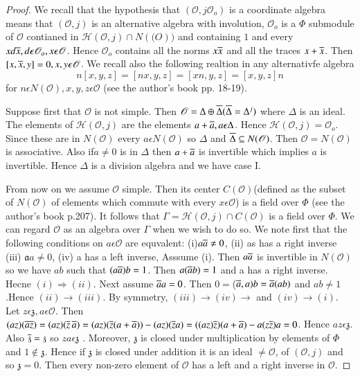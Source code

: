 \begin{proof}
We recall that the hypothesis that $(\mathscr{O},j\mathscr{O}_o)$ is a
coordinate algebra means that $(\mathscr{O},j)$ is an alternative
algebra with involution, $\mathscr{O}_o$ is a $\Phi$ submodule of
$\mathscr{O}$ contianed in
$\mathscr{H}(\mathscr{O},j)\cap N(\mathscr(O))$ and containing $1$ and
every $x d\overline{x}, d\epsilon \mathscr{O}_o,x\epsilon
\mathscr{O}$. Hence $\mathscr{O}_o$ contains all the norms $x\overline{x}$
and all the traces $x+\overline{x}$. Then $[x,\overline{x},y]=0,x,y\epsilon
  \mathscr{O}$. We recall also the following realtion in any
  alternativfe algebra
\begin{equation*}
n[x,y,z]=[nx,y,z]=[xn,y,z]=[x,y,z]n\tag{17}\label{c3:eq17}
\end{equation*} 
for $n\epsilon N(\mathscr{O}),x,y,z\epsilon \mathscr{O}$ (see the
author's book pp. 18-19).

Suppose first that $\mathscr{O}$ is not simple. Then
$\mathscr{O}=\Delta\oplus \overline{\Delta}(\overline{\Delta}=\Delta^{j})$ where
$\Delta$ is an ideal. The elements of $\mathscr{H}(\mathscr{O},j)$ are
the elements $a+\overline{a},a\epsilon \Delta$. Hence
$\mathscr{H}(\mathscr{O}, j)= \mathscr{O}_o$. Since these are in
$N(\mathscr{O})$ every 
$a\epsilon N(\mathscr{O}) $ so $\Delta$ and $\overline{\Delta}\subseteq
N(\mathscr{O})$. Then $\mathscr{O}=N (\mathscr{O})$ is
associative. Also if\pageoriginale $a\neq 0$ is in 
$\Delta$ then $a+\overline{a}$ is invertible which implies $a$ is
invertible. Hence $\Delta$ is a division algebra and we have case I. 

From now on we assume $\mathscr{O}$ simple. Then its center
$C(\mathscr{O})$(defined as the subset of $N(\mathscr{O})$ of elements
which commute with every $x\epsilon \mathscr{O}$) is a field over
$\Phi$ (see the author's book p.207). It follows that
$\Gamma=\mathscr{H}(\mathscr{O},j)\cap C(\mathscr{O})$ is a field over
$\Phi$. We can regard $\mathscr{O}$ as an algebra over $\Gamma$ when
we wish to do so. We note first that the following conditions on
$a\epsilon \mathscr{O}$ are equvalent: (i)$a\overline{a}\neq 0$, (ii) as has
a right inverse (iii) $\mathfrak{a}a\neq 0$, (iv) a has a left inverse,
Asssume (i). Then $a{\overline{a}}$ is invertible in $N(\mathscr{O})$ so
we have $ab$ such that $(a \overline{a})b=1$. Then $a(\overline{a}b)=1$ and a has a
right inverse. Hecne $(i)\Rightarrow (ii)$. Next assume
$\overline{a}a=0$. Then $0=$($\overline{a},a)b=\overline{a}(ab)$ and $ab\neq1$.Hence
$(ii)\to(iii)$. By symmetry, $(iii)\to (iv)\to$ and $(iv)\to (i)$. Let
$z\epsilon \mathfrak{z},a\epsilon \mathscr{O}$. Then
$(az)(\overline{az})=(az)(\overline{z}\,\overline{a})=(az)(\overline{z}(a+\overline{a}))-(az)(\overline{z}a)=((az)\overline{z})(a+\overline{a})-a(z\overline{z})a=0$. Hence
$az\epsilon \mathfrak{z}$. Also $\overline{\mathfrak{z}}=\mathfrak{z}$ so
$za\epsilon \mathfrak{z}$ . Moreover, $\mathfrak{z}$ is closed under
multiplication by elements of $\Phi$ and $1\notin \mathfrak{z}$. Hence if
$\mathfrak{z}$ is closed under addition it is an ideal $\neq
\mathscr{O}$, of $(\mathscr{O},j)$ and so $\mathfrak{z}=0$. Then every
non-zero element of $\mathscr{O}$ has a left and a right inverse in
$\mathscr{O}$. 


\end{proof}
